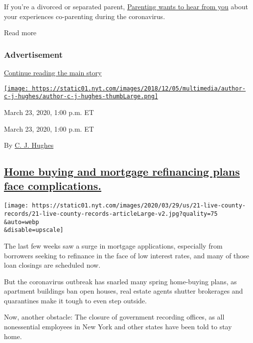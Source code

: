 If you're a divorced or separated parent,
\href{mailto:parenting_submissions@nytimes.com?subject=Newsletter\%20Suggestions}{Parenting
wants to hear from you} about your experiences co-parenting during the
coronavirus.

Read more

\hypertarget{advertisement-5}{%
\subsubsection{Advertisement}\label{advertisement-5}}

\protect\hyperlink{after-dfp-ad-mid6}{Continue reading the main story}

\href{https://www.nytimes.com/by/c-j-hughes}{\texttt{[image: https://static01.nyt.com/images/2018/12/05/multimedia/author-c-j-hughes/author-c-j-hughes-thumbLarge.png]}}

March 23, 2020, 1:00 p.m. ET

March 23, 2020, 1:00 p.m. ET

By \href{https://www.nytimes.com/by/c-j-hughes}{C. J. Hughes}

\hypertarget{home-buying-and-mortgage-refinancing-plans-face-complications}{%
\subsection{\texorpdfstring{\protect\hyperlink{home-buying-and-mortgage-refinancing-plans-face-complications}{Home
buying and mortgage refinancing plans face
complications.}}{Home buying and mortgage refinancing plans face complications.}}\label{home-buying-and-mortgage-refinancing-plans-face-complications}}

\texttt{[image: https://static01.nyt.com/images/2020/03/29/us/21-live-county-records/21-live-county-records-articleLarge-v2.jpg?quality=75\\\&auto=webp\\\&disable=upscale]}

The last few weeks saw a surge in mortgage applications, especially from
borrowers seeking to refinance in the face of low interest rates, and
many of those loan closings are scheduled now.

But the coronavirus outbreak has snarled many spring home-buying plans,
as apartment buildings ban open houses, real estate agents shutter
brokerages and quarantines make it tough to even step outside.

Now, another obstacle: The closure of government recording offices, as
all nonessential employees in New York and other states have been told
to stay home.

